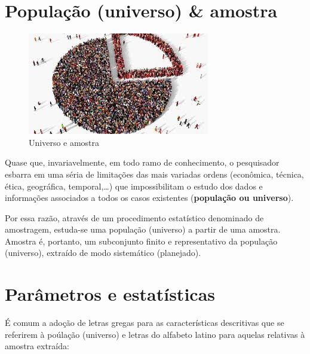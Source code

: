 \documentclass[
]{book}
\begin{document}
\hypertarget{populauxe7uxe3o-universo-amostra}{%
\section{População (universo) \& amostra}\label{populauxe7uxe3o-universo-amostra}}

\begin{figure}

{\centering \includegraphics[width=1\linewidth]{images2/amostragem} 

}

\caption{Universo e amostra}\label{fig:unnamed-chunk-5}
\end{figure}

Quase que, invariavelmente, em todo ramo de conhecimento, o pesquisador esbarra em uma séria de limitações das mais variadas ordens (econômica, técnica, ética, geográfica, temporal,\ldots) que impossibilitam o estudo dos dados e informações associados a todos os casos existentes (\textbf{população ou universo}).

Por essa razão, através de um procedimento estatístico denominado de amostragem, estuda-se uma população (universo) a partir de uma amostra. Amostra é, portanto, um subconjunto finito e representativo da população (universo), extraído de modo sistemático (planejado).

\hypertarget{paruxe2metros-e-estatuxedsticas}{%
\section{Parâmetros e estatísticas}\label{paruxe2metros-e-estatuxedsticas}}

É comum a adoção de letras gregas para as características descritivas que se referirem à poúlação (universo) e letras do alfabeto latino para aquelas relativas à amostra extraída:
\end{document}
